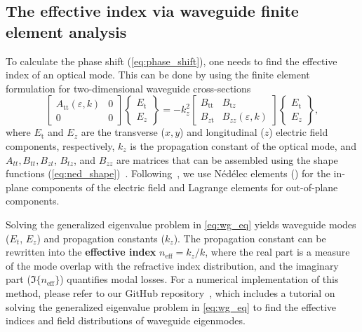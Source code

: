 \subsection*{The effective index via waveguide finite element analysis}

To calculate the phase shift (\eqref{eq:phase_shift}), one needs to find the effective index of an optical mode. This can be done by 
using the finite element formulation for two-dimensional waveguide cross-sections~\cite{jin}
\begin{equation}\label{eq:wg_eq}
 \left[\begin{array}{cc}
 A_{\text{tt}}(\varepsilon,k) & 0 \\
    0 & 0
    \end{array}\right]
 \left\{\begin{array}{l}
 E_{\text{t}} \\
 E_z
    \end{array}\right\}
 = -k_z^2
 \left[\begin{array}{cc}
 B_{\text{tt}} & B_{\text{t} z} \\
 B_{z \text{t}} & B_{z z}(\varepsilon,k)
    \end{array}\right]
 \left\{\begin{array}{c}
 E_{\text{t}} \\
 E_z
    \end{array}\right\},
    \end{equation}
where $E_{\text{t}}$ and $E_z$ are the transverse ($x,y$) and longitudinal ($z$) electric field components, respectively, $k_z$ is the propagation constant of the optical mode, and $A_{tt}, B_{tt},
B_{zt}$, $B_{tz}$, and $B_{zz}$ are matrices that can be assembled using the shape functions (\eqref{eq:ned_shape})~\cite{jin}. Following~\cite{jin}, we use Nédélec elements () for the in-plane components of the electric field and 
Lagrange elements for out-of-plane components. 

Solving the generalized eigenvalue problem in \eqref{eq:wg_eq} yields waveguide modes ($E_t$, $E_z$) and propagation constants ($k_z$). The propagation constant can be rewritten into the \textbf{effective index} $n_\text{eff} = k_z / k$,
 where the real part is a measure of the mode overlap with the refractive index distribution, and the imaginary part ($\Im\{n_\text{eff}\}$) quantifies modal losses. For a numerical implementation of this method, please refer to our GitHub repository~\cite{FEWEC}, which includes a tutorial on solving the 
 generalized eigenvalue problem in \eqref{eq:wg_eq} to find the effective indices and field distributions of waveguide eigenmodes.

